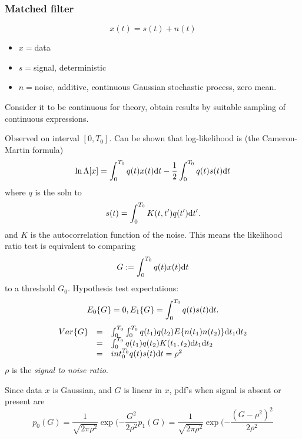 \subsubsection{Matched filter}
\begin{equation}
x(t)=s(t)+n(t)
\end{equation}
\begin{itemize}
\item $x=$data
\item $s=$signal, deterministic
\item $n=$noise, additive, continuous Gaussian stochastic process, zero mean. 
\end{itemize}
Consider it to be continuous for theory, obtain results by suitable sampling of continuous expressions.

Observed on interval $[0,T_0]$. Can be shown that log-likelihood is (the Cameron-Martin formula)
\begin{equation}
\label{eq:Cameron-Martin}
\ln \Lambda [x] =  \int_0^{T_0}q(t)x(t){\mbox{d}} t - \frac{1}{2}\int_0^{T_0}q(t)s(t){\mbox{d}} t
\end{equation}
where $q$ is the soln to
\begin{equation}
s(t) = \int_0^{T_0} K(t,t')q(t'){\mbox{d}} t'.
\end{equation}
and $K$ is the autocorrelation function of the noise. This means the likelihood ratio test is equivalent to comparing 
\begin{equation}
G:=\int_0^{T_0}q(t)x(t){\mbox{d}} t
\end{equation}
to a threshold $G_0$. Hypothesis test expectations:
\begin{equation}
E_0\{G\}=0,\\
E_1\{G\} = \int_0^{T_0}q(t)s(t){\mbox{d}} t.
\end{equation}
\begin{equation}
\begin{array}{rcl}
Var\{G\}&=& \int_0^{T_0}\int_0^{T_0}q(t_1)q(t_2)E\{n(t_1)n(t_2)\}{\mbox{d}} t_1  {\mbox{d}} t_2 \\
&=&\int_0^{T_0}q(t_1)q(t_2)K(t_1,t_2){\mbox{d}} t_1  {\mbox{d}} t_2\\
&=&int_0^{T_0}q(t)s(t){\mbox{d}} t = \rho^2
\end{array}
\end{equation}
$\rho$ is the \textit{signal to noise ratio}.

Since data $x$ is Gaussian, and $G$ is linear in $x$, pdf's when signal is absent or present are
\begin{equation}
p_0(G)=\frac{1}{\sqrt{2\pi\rho^2}}\exp(-\frac{G^2}{2\rho^2}
p_1(G)=\frac{1}{\sqrt{2\pi\rho^2}}\exp(-\frac{(G-\rho^2)^2}{2\rho^2}
\end{equation}


%
